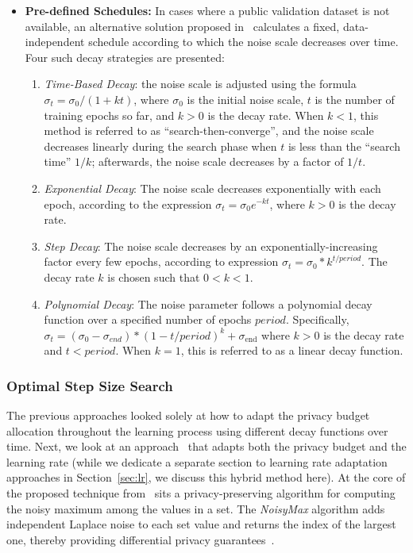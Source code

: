 \begin{itemize}
    \item \textbf{Pre-defined Schedules: }
    In cases where a public validation dataset is not available, an alternative solution proposed in~\cite{RefWorks:RefID:47-yu2019differentially} calculates a fixed, data-independent schedule according to which the noise scale decreases over time. Four such decay strategies are presented:

\begin{enumerate}
    \renewcommand{\labelenumi}{\alph{enumi})}
    \item {\em Time-Based Decay}: the noise scale is adjusted using the formula $\sigma_t=\sigma_0/(1+kt)$, where $\sigma_0$ is the initial noise scale, $t$ is the number of training epochs so far, and $k>0$ is the decay rate. When $k<1$, this method is referred to as ``search-then-converge'', and the noise scale decreases linearly during the search phase when $t$ is less than the ``search time'' $1/k$; afterwards, the noise scale decreases by a factor of $1/t$.
    \item {\em Exponential Decay}: The noise scale decreases exponentially with each epoch, according to the expression $\sigma_t=\sigma_0e^{-kt}$, where $k>0$ is the decay rate.
    \item {\em Step Decay}: The noise scale decreases by an exponentially-increasing factor every few epochs, according to expression $\sigma_t=\sigma_0*k^{t/period}$. The decay rate $k$ is chosen such that $0<k<1$.
    \item {\em Polynomial Decay}: The noise parameter follows a polynomial decay function over a specified number of epochs $period$. Specifically,  $\sigma_t=(\sigma_0-\sigma_{end})*(1-t/period)^k+\sigma_\text{end}$ where $k>0$ is the decay rate and $t<period$. When $k=1$, this is referred to as a linear decay function.
\end{enumerate}

\end{itemize}
\subsubsection{Optimal Step Size Search}
\label{sec:step}
The previous approaches looked solely at how to adapt the privacy budget allocation throughout the learning process using different decay functions over time. Next, we look at an approach~\cite{concentrated} that adapts both the privacy budget and the learning rate (while we dedicate a separate section to learning rate adaptation approaches in Section~\ref{sec:lr}, we discuss this hybrid method here).
At the core of the proposed technique from~\cite{concentrated} sits a privacy-preserving algorithm for computing the noisy maximum among the values in a set. The {\em NoisyMax} algorithm   adds independent Laplace noise to each set value and returns the index of the largest one, thereby providing differential privacy guarantees~\cite{concentrated}.

